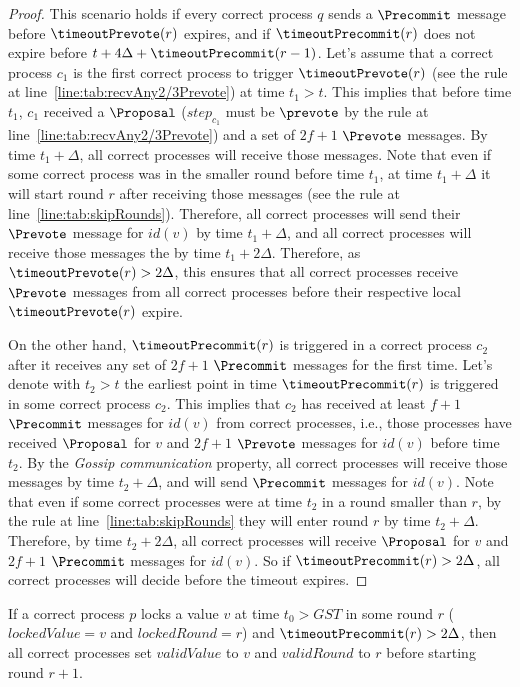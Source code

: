 \begin{proof}
This scenario holds if every correct process $q$ sends a $\Precommit$ message
before $\timeoutPrevote(r)$ expires, and if $\timeoutPrecommit(r)$ does not expire
before $t + 4\Delta + \timeoutPrecommit(r-1)$.  Let's assume that a correct process
$c_1$ is the first correct process to trigger $\timeoutPrevote(r)$ (see the rule
at line~\ref{line:tab:recvAny2/3Prevote}) at time $t_1 > t$. This implies that
before time $t_1$, $c_1$ received a $\Proposal$ ($step_{c_1}$ must be
$\prevote$ by the rule at line~\ref{line:tab:recvAny2/3Prevote}) and a set of
$2f+1$ $\Prevote$ messages.  By time $t_1 + \Delta$, all correct processes will
receive those messages. Note that even if some correct process was in the
smaller round before time $t_1$, at time $t_1 + \Delta$ it will start round $r$
after receiving those messages (see the rule at
line~\ref{line:tab:skipRounds}).  Therefore, all correct processes will send
their $\Prevote$ message for $id(v)$ by time $t_1 + \Delta$, and all correct
processes will receive those messages the by time $t_1 + 2\Delta$.  Therefore,
as $\timeoutPrevote(r) > 2\Delta$, this ensures that all correct processes receive
$\Prevote$ messages from all correct processes before their respective local
$\timeoutPrevote(r)$ expire.   

On the other hand, $\timeoutPrecommit(r)$ is triggered in a correct process $c_2$
after it receives any set of $2f+1$ $\Precommit$ messages for the first time.
Let's denote with $t_2 > t$ the earliest point in time $\timeoutPrecommit(r)$ is
triggered in some correct process $c_2$. This implies that $c_2$ has received
at least $f+1$ $\Precommit$ messages for $id(v)$ from correct processes, i.e.,
those processes have received $\Proposal$ for $v$ and $2f+1$ $\Prevote$
messages for $id(v)$ before time $t_2$. By the \emph{Gossip communication}
property, all correct processes will receive those messages by time $t_2 +
\Delta$, and will send $\Precommit$ messages for $id(v)$. Note that even if
some correct processes were at time $t_2$ in a round smaller than $r$, by the
rule at line~\ref{line:tab:skipRounds} they will enter round $r$ by time $t_2 +
\Delta$.  Therefore, by time $t_2 + 2\Delta$, all correct processes will
receive $\Proposal$ for $v$ and $2f+1$ $\Precommit$ messages for $id(v)$. So if
$\timeoutPrecommit(r) > 2\Delta$, all correct processes will decide before the
timeout expires.         \end{proof}	


\begin{lemma} \label{lemma:validValue} If a correct process $p$ locks a value
    $v$ at time $t_0 > GST$ in some round $r$ ($lockedValue = v$ and
    $lockedRound = r$) and $\timeoutPrecommit(r) > 2\Delta$, then all correct
    processes set $validValue$ to $v$ and $validRound$ to $r$ before starting
    round $r+1$.  \end{lemma}
 

